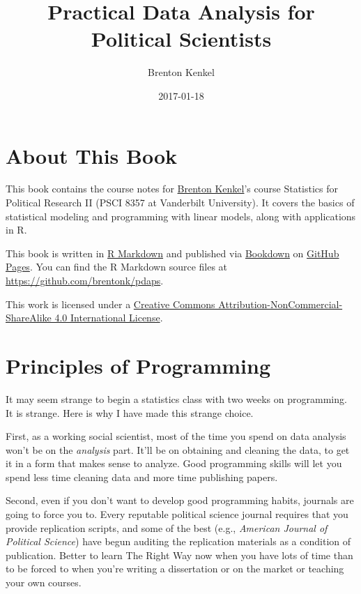 \documentclass[12pt,oneside,openany]{tufte-book}
\title{Practical Data Analysis for Political Scientists}
\author{Brenton Kenkel}
\date{2017-01-18}
\begin{document}
\maketitle



{
\setcounter{tocdepth}{1}
\tableofcontents
}

\chapter{About This Book}\label{about-this-book}

This book contains the course notes for
\href{http://bkenkel.com}{Brenton Kenkel}'s course Statistics for
Political Research II (PSCI 8357 at Vanderbilt University). It covers
the basics of statistical modeling and programming with linear models,
along with applications in R.

This book is written in \href{http://rmarkdown.rstudio.com}{R Markdown}
and published via \href{https://bookdown.org}{Bookdown} on
\href{https://pages.github.com}{GitHub Pages}. You can find the R
Markdown source files at \url{https://github.com/brentonk/pdaps}.

This work is licensed under a
\href{http://creativecommons.org/licenses/by-nc-sa/4.0/}{Creative
Commons Attribution-NonCommercial-ShareAlike 4.0 International License}.

\hypertarget{programming}{\chapter{Principles of
Programming}\label{programming}}

It may seem strange to begin a statistics class with two weeks on
programming. It is strange. Here is why I have made this strange choice.

First, as a working social scientist, most of the time you spend on data
analysis won't be on the \emph{analysis} part. It'll be on obtaining and
cleaning the data, to get it in a form that makes sense to analyze. Good
programming skills will let you spend less time cleaning data and more
time publishing papers.

Second, even if you don't want to develop good programming habits,
journals are going to force you to. Every reputable political science
journal requires that you provide replication scripts, and some of the
best (e.g., \emph{American Journal of Political Science}) have begun
auditing the replication materials as a condition of publication. Better
to learn The Right Way now when you have lots of time than to be forced
to when you're writing a dissertation or on the market or teaching your
own courses.
\end{document}
